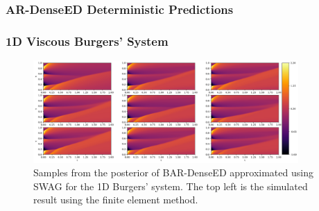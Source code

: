 \documentclass{beamer}
\theoremstyle{remark}
\begin{document}
\begin{frame}
\frametitle{AR-DenseED Deterministic Predictions}
\begin{table}[H]
    \caption{Wall-clock time of finite element, finite difference and AR-DenseED to simulate $400$ time-steps of the 1D-Burgers' system.
    Wall-clock time estimates were obtained by averaging $10$ independent simulation run times.}
    \label{tab:burger1d-wallclock}
\end{table}
\end{frame}


\begin{frame}
\frametitle{1D Viscous Burgers' System}
%
\begin{figure}[H]
    \centering
    \includegraphics[width=0.9\textwidth]{Fig12.png}
    \caption{Samples from the posterior of BAR-DenseED approximated using SWAG for the 1D Burgers' system. The top left is the simulated result using the finite element method.} 
    \label{fig:burgers1D-bar-samples}
\end{figure}
\end{frame}
\end{document}
